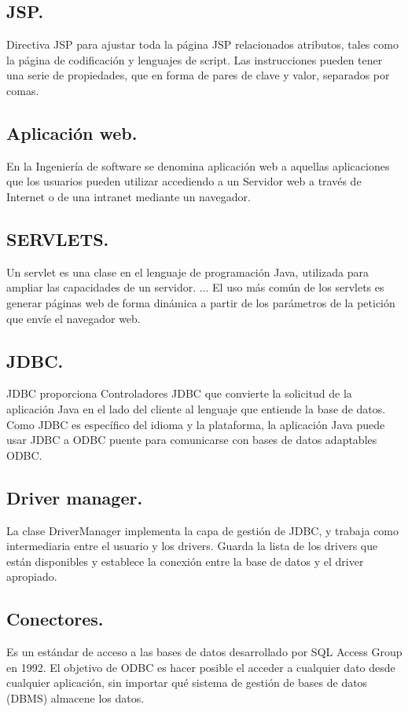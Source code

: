\documentclass[10pt,a4paper]{article}
\begin{document}
\subsection{JSP.}
Directiva JSP para ajustar toda la página JSP relacionados atributos, tales como la página de codificación y lenguajes de script. Las instrucciones pueden tener una serie de propiedades, que en forma de pares de clave y valor, separados por comas.

\subsection{Aplicación web.}
En la Ingeniería de software se denomina aplicación web a aquellas aplicaciones que los usuarios pueden utilizar accediendo a un Servidor web a través de Internet o de una intranet mediante un navegador.

\subsection{SERVLETS.}
Un servlet es una clase en el lenguaje de programación Java, utilizada para ampliar las capacidades de un servidor. ... El uso más común de los servlets es generar páginas web de forma dinámica a partir de los parámetros de la petición que envíe el navegador web.

\subsection{JDBC.}
JDBC proporciona Controladores JDBC que convierte la solicitud de la aplicación Java en el lado del cliente al lenguaje que entiende la base de datos. Como JDBC es específico del idioma y la plataforma, la aplicación Java puede usar JDBC a ODBC puente para comunicarse con bases de datos adaptables ODBC.

\subsection{Driver manager.}
La clase DriverManager implementa la capa de gestión de JDBC, y trabaja como intermediaria entre el usuario y los drivers. Guarda la lista de los drivers que están disponibles y establece la conexión entre la base de datos y el driver apropiado.

\subsection{Conectores.}
Es un estándar de acceso a las bases de datos desarrollado por SQL Access Group en 1992. El objetivo de ODBC es hacer posible el acceder a cualquier dato desde cualquier aplicación, sin importar qué sistema de gestión de bases de datos (DBMS) almacene los datos.
\end{document}
